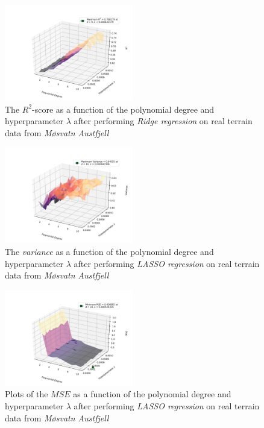 \documentclass[a4paper,10pt,english]{article}
\begin{document}
\begin{figure}[H]
	\centering 
	\includegraphics[width = 0.5\textwidth, center]{../real_output/part_D_3.png}
	\caption{The $R^2$-score as a function of the polynomial degree and hyperparameter $\lambda$ after performing \textit{Ridge regression} on real terrain data from \textit{Møsvatn Austfjell}}
	\label{part_g_d3}
\end{figure}

\begin{figure}[H]
	\centering 
	\includegraphics[width = 0.5\textwidth, center]{../real_output/part_E_1.png}
	\caption{The \textit{variance} as a function of the polynomial degree and hyperparameter $\lambda$ after performing \textit{LASSO regression} on real terrain data from \textit{Møsvatn Austfjell}}
	\label{part_g_e1}
\end{figure}

\begin{figure}[H]
	\centering 
	\includegraphics[width = 0.5\textwidth, center]{../real_output/part_E_2.png}
	\caption{Plots of the $MSE$ as a function of the polynomial degree and hyperparameter $\lambda$ after performing \textit{LASSO regression} on real terrain data from \textit{Møsvatn Austfjell}}
	\label{part_g_e2}
\end{figure}
\end{document}
